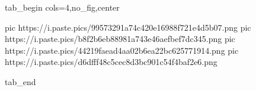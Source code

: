  
 
 
 
 

\ifcmt
  tab_begin cols=4,no_fig,center

     pic https://i.paste.pics/99573291a74c420e16988f721e4d5b07.png
     pic https://i.paste.pics/b8f2b6eb88981a743e46aefbef7dc345.png
     pic https://i.paste.pics/44219faead4aa02b6ea22bc625771914.png
     pic https://i.paste.pics/d6dfff48c5cec8d3bc901c54f4baf2e6.png

  tab_end
\fi
